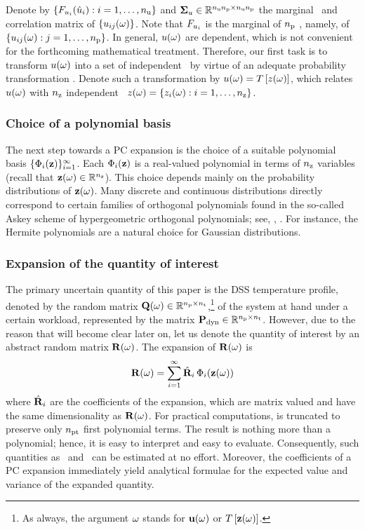 Denote by $\{ F_{u_i}(\hat{u}_i): i = 1, \dots, {n_\text{u}} \}$ and $\mathbf{\Sigma}_u \in \mathbb{R}^{{n_\text{u}} {n_\text{p}} \times {n_\text{u}} {n_\text{p}}}$ the marginal \cdfs\ and correlation matrix of $\{ u_{ij}(\omega) \}$.
Note that $F_{u_i}$ is the marginal of ${n_\text{p}}$ \rvs, namely, of $\{ u_{ij}(\omega): j = 1, \dots, {n_\text{p}} \}$.
In general, $u(\omega)$ are dependent, which is not convenient for the forthcoming mathematical treatment.
Therefore, our first task is to transform $u(\omega)$ into a set of independent \rvs\ by virtue of an adequate probability transformation \cite{eldred2008}.
Denote such a transformation by $\u(\o) = \oTransform{\z(\o)}$, which relates $u(\omega)$ with ${n_\text{z}}$ independent \rvs\ $z(\omega) = \{ z_i(\omega): i = 1, \dots, {n_\text{z}} \}$.

\subsubsection{Choice of a polynomial basis}
The next step towards a PC expansion is the choice of a suitable polynomial basis $\{ \Phi_i(\mathbf{z}) \}_{i = 1}^\infty$.
Each $\Phi_i(\mathbf{z})$ is a real-valued polynomial in terms of ${n_\text{z}}$ variables (recall that $\mathbf{z}(\omega) \in \mathbb{R}^{n_\text{z}}$).
This choice depends mainly on the probability distributions of $\mathbf{z}(\omega)$.
Many discrete and continuous distributions directly correspond to certain families of orthogonal polynomials found in the so-called Askey scheme of hypergeometric orthogonal polynomials; see, \eg, \cite{eldred2008}.
For instance, the Hermite polynomials are a natural choice for Gaussian distributions.

\subsubsection{Expansion of the quantity of interest}
The primary uncertain quantity of this paper is the DSS temperature profile, denoted by the random matrix $\mathbf{Q}(\omega) \in \mathbb{R}^{{n_\text{p}} \times {n_\text{t}}}$,\footnote{As always, the argument $\omega$ stands for $\mathbf{u}(\omega)$ or $\oTransform{\vZ(\o)}$.} of the system at hand under a certain workload, represented by the matrix $\mathbf{P}_{\text{dyn}} \in \mathbb{R}^{{n_\text{p}} \times {n_\text{t}}}$.
However, due to the reason that will become clear later on, let us denote the quantity of interest by an abstract random matrix $\mathbf{R}(\omega)$.
The expansion of $\mathbf{R}(\omega)$ is
\begin{equation} \elab{polynomial-chaos-expansion}
  \mR(\o) = \sum_{i = 1}^\infty \pcc{\mR}_i \, \pcb_i(\vZ(\o))
\end{equation}
where $\hat{\mathbf{R}}_i$ are the coefficients of the expansion, which are matrix valued and have the same dimensionality as $\mathbf{R}(\omega)$.
For practical computations,  is truncated to preserve only ${n_\text{pt}}$ first polynomial terms.
The result is nothing more than a polynomial; hence, it is easy to interpret and easy to evaluate.
Consequently, such quantities as \cdfs\ and \pdfs\ can be estimated at no effort.
Moreover, the coefficients of a PC expansion immediately yield analytical formulae for the expected value and variance of the expanded quantity.


